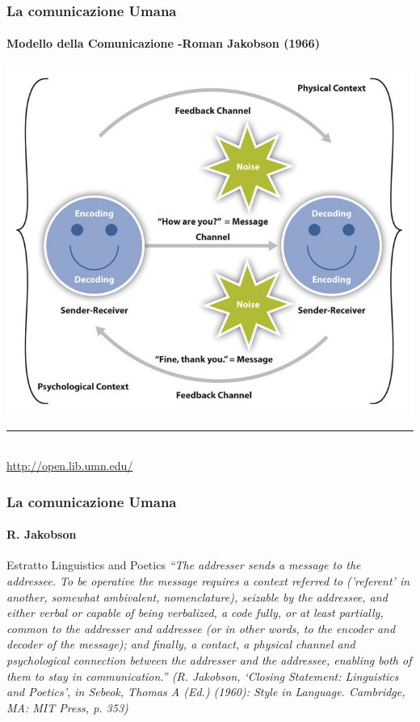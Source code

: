 \begin{frame}
	\frametitle{La comunicazione Umana}
	\framesubtitle{Modello della Comunicazione -Roman Jakobson (1966)}
	\addtocounter{nframe}{1}

	\begin{center}
		\includegraphics[width=.73\textwidth]{imgs/RomanJakobson.jpg}
	\end{center}
	\noindent\rule{5cm}{0.01cm}
	\\\tiny\url{http://open.lib.umn.edu/}

\end{frame}

\begin{frame}
	\frametitle{La comunicazione Umana}
	\framesubtitle{R. Jakobson}
	\addtocounter{nframe}{1}

	\begin{block}{Estratto Linguistics and Poetics}
		\textit{“The addresser sends a message to the addressee. To be
			operative the message requires a context referred to
			('referent' in another, somewhat ambivalent, nomenclature),
			seizable by the addressee, and either verbal or capable of
			being verbalized, a code fully, or at least partially, common to
			the addresser and addressee (or in other words, to the
			encoder and decoder of the message); and finally, a contact,
			a physical channel and psychological connection between the
			addresser and the addressee, enabling both of them to stay in
			communication.” (R. Jakobson, ‘Closing Statement:
			Linguistics and Poetics’, in Sebeok, Thomas A (Ed.) (1960):
			Style in Language. Cambridge, MA: MIT Press, p. 353)}
	\end{block}

\end{frame}

